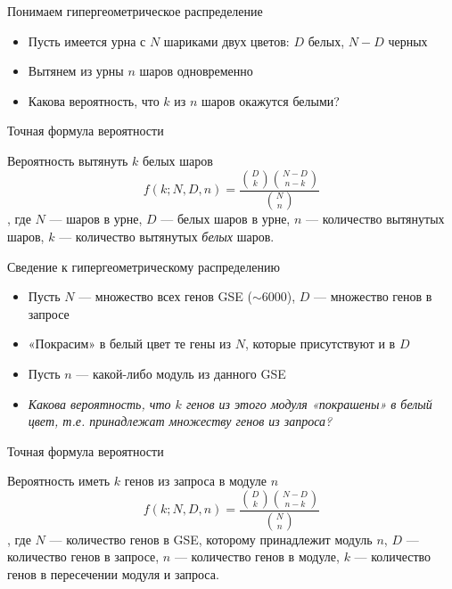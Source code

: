 \documentclass[10pt,pdf,utf8,russian,aspectratio=169]{beamer}
\begin{document}
\begin{frame}{Понимаем гипергеометрическое распределение}
  \begin{itemize}[<+->]
    \item Пусть имеется урна с $N$ шариками двух цветов: $D$ белых, $N - D$ черных
    \item Вытянем из урны $n$ шаров одновременно
    \item Какова вероятность, что $k$ из $n$ шаров окажутся белыми?
  \end{itemize}
\end{frame}

\begin{frame}{Точная формула вероятности}
    \begin{block}{Вероятность вытянуть $k$ белых шаров}
        \begin{equation}
        f(k; N, D, n) = \frac{\binom{D}{k}\binom{N - D}{n - k}}{\binom{N}{n}}
        \end{equation},
        где $N$ --- шаров в урне,
            $D$ --- белых шаров в урне,
            $n$ --- количество вытянутых шаров,
            $k$ --- количество вытянутых \emph{белых} шаров.
    \end{block}
\end{frame}

\begin{frame}{Сведение к гипергеометрическому распределению}
  \begin{itemize}[<+->]
    \item Пусть $N$ --- множество всех генов GSE ($\sim 6000$), $D$ --- множество генов в запросе
    \item «Покрасим» в белый цвет те гены из $N$, которые присутствуют и в $D$
    \item Пусть $n$ --- какой-либо модуль из данного GSE
    \item \emph{Какова вероятность, что $k$ генов из этого модуля «покрашены» в белый цвет, т.е. принадлежат множеству генов из запроса?}
  \end{itemize}
\end{frame}

\begin{frame}{Точная формула вероятности}
    \begin{block}{Вероятность иметь $k$ генов из запроса в модуле $n$}
        \begin{equation}
        f(k; N, D, n) = \frac{\binom{D}{k}\binom{N - D}{n - k}}{\binom{N}{n}}
        \end{equation},
        где $N$ --- количество генов в GSE, которому принадлежит модуль $n$,
            $D$ --- количество генов в запросе,
            $n$ --- количество генов в модуле,
            $k$ --- количество генов в пересечении модуля и запроса.
    \end{block}
\end{frame}
\end{document}
